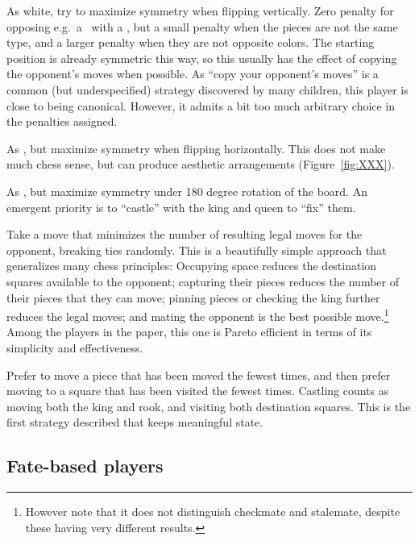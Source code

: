 \documentclass[10pt,preprint,twocolumn]{acmart}
\newcommand{\King}[1][1.95ex]{%
\adjustbox{Trim=2pt 2pt 2pt 0pt,width=#1,raise=-0.06ex,margin=0.13ex 0ex 0.13ex 0ex}{\BlackKingOnWhite}%
}%
\begin{document}
 As white, try to maximize symmetry
when flipping vertically. Zero penalty for opposing e.g.~a \King\, with
a \king, but a small penalty when the pieces are not the same type,
and a larger penalty when they are not opposite colors. The starting
position is already symmetric this way, so this usually has the effect
of copying the opponent's moves when possible. As ``copy your
opponent's moves'' is a common (but underspecified) strategy
discovered by many children, this player is close to being canonical.
However, it admits a bit too much arbitrary choice in the penalties
assigned.

 As , but
maximize symmetry when flipping horizontally. This does not make much
chess sense, but can produce aesthetic arrangements
(Figure~\ref{fig:XXX}).

 As , but maximize
symmetry under 180 degree
rotation of the board. An emergent priority is
to ``castle'' with the king and queen to ``fix'' them.

 Take a move that minimizes the
number of resulting legal moves for the opponent, breaking ties
randomly. This is a beautifully simple approach that generalizes many
chess principles: Occupying space reduces the destination squares
available to the opponent; capturing their pieces reduces the number
of their pieces that they can move; pinning pieces or checking the
king further reduces the legal moves; and mating the opponent is the
best possible move.\footnote{However note that it does not distinguish
  checkmate and stalemate, despite these having very different
  results.} Among the players in the paper, this one is Pareto
efficient in terms of its simplicity and effectiveness. \canonical

 Prefer to move a piece that has been
moved the fewest times, and then prefer moving to a square that
has been visited the fewest times. Castling counts as moving
both the king and rook, and visiting both destination squares.
This is the first strategy described that keeps meaningful state.
\canonical \stateful

\subsection{Fate-based players}
\end{document}
